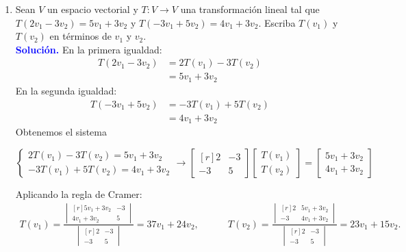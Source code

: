 \documentclass[11pt]{article}
\newcommand{\solution}{\textcolor{blue}{\textbf{Solución. }}}
\begin{document}
\begin{enumerate}
	\item Sean $V$ un espacio vectorial y $T:V\rightarrow V$ una transformación lineal tal que $T(2v_1-3v_2)=5v_1+3v_2$ y $T(-3v_1+5v_2) = 4v_1+3v_2$. Escriba $T(v_1)$ y $T(v_2)$ en términos de $v_1$ y $v_2$. \\
	\solution En la primera igualdad:
	\begin{align*}
		T(2v_1-3v_2) &= 2T(v_1)-3T(v_2) \\
					 &= 5v_1+3v_2
	\end{align*}
	En la segunda igualdad:
	\begin{align*}
		T(-3v_1+5v_2) &= -3T(v_1)+5T(v_2) \\
					  &= 4v_1+3v_2
	\end{align*}
	Obtenemos el sistema
	\begin{center}
		$\begin{cases}
					2T(v_1)-3T(v_2) = 5v_1+3v_2 \\
					-3T(v_1)+5T(v_2)= 4v_1+3v_2
		\end{cases} \rightarrow
		\begin{bmatrix*}[r] 
		    2 & -3 \\
		    -3 & 5
		\end{bmatrix*}\begin{bmatrix} T(v_1) \\ T(v_2) \end{bmatrix} = \begin{bmatrix} 5v_1+3v_2 \\ 4v_1+3v_2 \end{bmatrix}$
	\end{center}
		
	Aplicando la regla de Cramer:
	\begin{gather*}
			T(v_1) = \frac{\begin{vmatrix*}[r] 	5v_1+3v_2 & -3 \\ 4v_1+3v_2 & 5 \end{vmatrix*}}{\begin{vmatrix*}[r] 2 & -3 \\ -3 & 5 \end{vmatrix*}} = 37v_1 + 24v_2, \quad \quad \quad T(v_2) = \frac{\begin{vmatrix*}[r] 2 & 5v_1+3v_2 \\ -3 & 4v_1+3v_2 \end{vmatrix*}}{\begin{vmatrix*}[r] 2 & -3 \\ -3 & 5 \end{vmatrix*}} = 23v_1+15v_2.
	\end{gather*}
		

\end{enumerate}
\end{document}
